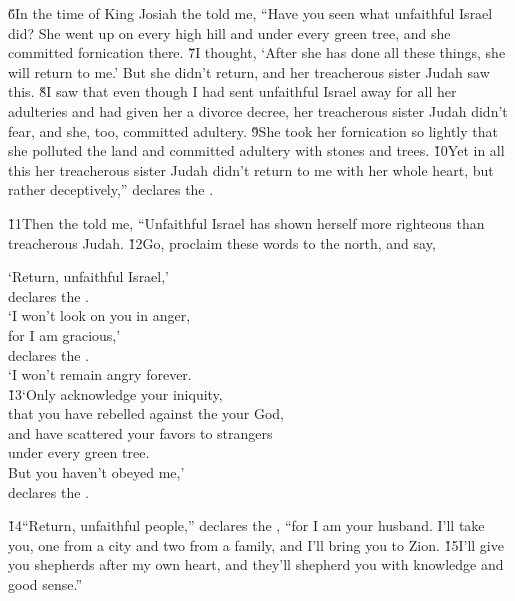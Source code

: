 \v{6}In the time of King Josiah the  told me, ``Have you seen what unfaithful Israel did? She went up on every high hill and under every green tree, and she committed fornication there. \v{7}I thought, `After she has done all these things, she will return to me.' But she didn't return, and her treacherous sister Judah saw this. \v{8}I saw that even though I had sent unfaithful Israel away for all her adulteries and had given her a divorce decree, her treacherous sister Judah didn't fear, and she, too, committed adultery. \v{9}She took her fornication so lightly that she polluted the land and committed adultery with stones and trees. \v{10}Yet in all this her treacherous sister Judah didn't return to me with her whole heart, but rather deceptively,'' declares the .

\v{11}Then the  told me, ``Unfaithful Israel has shown herself more righteous than treacherous Judah. \v{12}Go, proclaim these words to the north, and say,

\begin{poetry}
\poeml `Return, unfaithful Israel,' \\
\poemll    declares the . \\
\poeml `I won't look on you in anger, \\
\poemll    for I am gracious,' \\
\poemlll       declares the . \\
\poeml `I won't remain angry forever. \\
\poeml \v{13}`Only acknowledge your iniquity, \\
\poemll    that you have rebelled against the  your God, \\
\poemll    and have scattered your favors to strangers \\
\poemlll       under every green tree. \\
\poeml But you haven't obeyed me,' \\
\poemlll       declares the .
\end{poetry}

\v{14}``Return, unfaithful people,'' declares the , ``for I am your husband. I'll take you, one from a city and two from a family, and I'll bring you to Zion. \v{15}I'll give you shepherds after my own heart, and they'll shepherd you with knowledge and good sense.''

